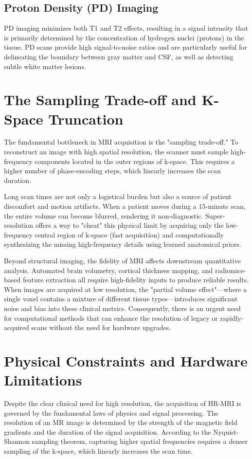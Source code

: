 \subsection{Proton Density (PD) Imaging}
PD imaging minimizes both T1 and T2 effects, resulting in a signal intensity that is primarily determined by the concentration of hydrogen nuclei (protons) in the tissue. PD scans provide high signal-to-noise ratios and are particularly useful for delineating the boundary between gray matter and CSF, as well as detecting subtle white matter lesions.

\section{The Sampling Trade-off and K-Space Truncation}
The fundamental bottleneck in MRI acquisition is the "sampling trade-off." To reconstruct an image with high spatial resolution, the scanner must sample high-frequency components located in the outer regions of k-space. This requires a higher number of phase-encoding steps, which linearly increases the scan duration.

Long scan times are not only a logistical burden but also a source of patient discomfort and motion artifacts. When a patient moves during a 15-minute scan, the entire volume can become blurred, rendering it non-diagnostic. Super-resolution offers a way to "cheat" this physical limit by acquiring only the low-frequency central region of k-space (fast acquisition) and computationally synthesizing the missing high-frequency details using learned anatomical priors.

Beyond structural imaging, the fidelity of MRI affects downstream quantitative analysis. Automated brain volumetry, cortical thickness mapping, and radiomics-based feature extraction all require high-fidelity inputs to produce reliable results. When images are acquired at low resolution, the "partial volume effect"—where a single voxel contains a mixture of different tissue types—introduces significant noise and bias into these clinical metrics. Consequently, there is an urgent need for computational methods that can enhance the resolution of legacy or rapidly-acquired scans without the need for hardware upgrades.

\section{Physical Constraints and Hardware Limitations}
Despite the clear clinical need for high resolution, the acquisition of HR-MRI is governed by the fundamental laws of physics and signal processing. The resolution of an MR image is determined by the strength of the magnetic field gradients and the duration of the signal acquisition. According to the Nyquist-Shannon sampling theorem, capturing higher spatial frequencies requires a denser sampling of the k-space, which linearly increases the scan time.

